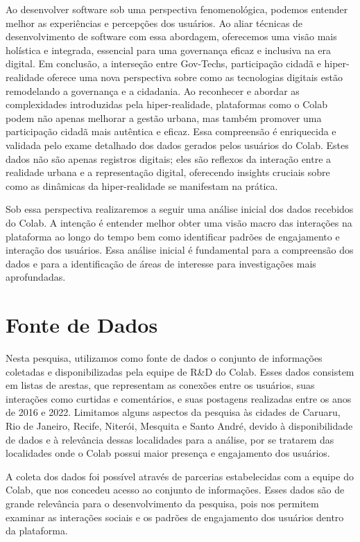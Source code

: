 Ao desenvolver software sob uma perspectiva fenomenológica, podemos entender melhor as experiências e percepções dos usuários. Ao aliar técnicas de desenvolvimento de software com essa abordagem, oferecemos uma visão mais holística e integrada, essencial para uma governança eficaz e inclusiva na era digital. Em conclusão, a interseção entre Gov-Techs, participação cidadã e hiper-realidade oferece uma nova perspectiva sobre como as tecnologias digitais estão remodelando a governança e a cidadania. Ao reconhecer e abordar as complexidades introduzidas pela hiper-realidade, plataformas como o Colab podem não apenas melhorar a gestão urbana, mas também promover uma participação cidadã mais autêntica e eficaz. Essa compreensão é enriquecida e validada pelo exame detalhado dos dados gerados pelos usuários do Colab. Estes dados não são apenas registros digitais; eles são reflexos da interação entre a realidade urbana e a representação digital, oferecendo insights cruciais sobre como as dinâmicas da hiper-realidade se manifestam na prática.

Sob essa perspectiva realizaremos a seguir uma análise inicial dos dados recebidos do Colab. A intenção é entender melhor obter uma visão macro das interações na plataforma ao longo do tempo bem como identificar padrões de engajamento e interação dos usuários. Essa análise inicial é fundamental para a compreensão dos dados e para a identificação de áreas de interesse para investigações mais aprofundadas. 

\section{Fonte de Dados}

Nesta pesquisa, utilizamos como fonte de dados o conjunto de informações coletadas e disponibilizadas pela equipe de R\&D do Colab. Esses dados consistem em listas de arestas, que representam as conexões entre os usuários, suas interações como curtidas e comentários, e suas postagens realizadas entre os anos de 2016 e 2022. Limitamos alguns aspectos da pesquisa às cidades de Caruaru, Rio de Janeiro, Recife, Niterói, Mesquita e Santo André, devido à disponibilidade de dados e à relevância dessas localidades para a análise, por se tratarem das localidades onde o Colab possui maior presença e engajamento dos usuários.

A coleta dos dados foi possível através de parcerias estabelecidas com a equipe do Colab, que nos concedeu acesso ao conjunto de informações. Esses dados são de grande relevância para o desenvolvimento da pesquisa, pois nos permitem examinar as interações sociais e os padrões de engajamento dos usuários dentro da plataforma. 

